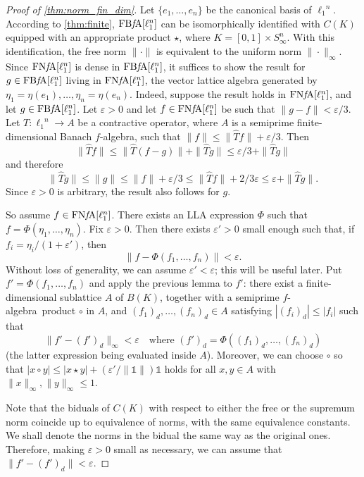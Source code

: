 \documentclass{memo-l}
\theoremstyle{definition}
\theoremstyle{remark}
\numberwithin{section}{chapter}
\numberwithin{equation}{chapter}
\newcommand{\el}[1]{\ensuremath{\ell_{#1}}}
\newcommand{\one}{\ensuremath{\mathbb{1}}}
\newcommand{\falg}{$f\!$-algebra}
\newcommand{\FNFA}[1]{\operatorname{FN{\it f}\!A}[#1]}
\newcommand{\FBFA}[1]{\operatorname{FB{\it f}\!A}[#1]}
\newcommand{\Sinfn}{S_\infty^n}
\begin{document}
\begin{proof}[Proof of \cref{thm:norm_fin_dim}]
    Let $\{e_1,\ldots ,e_n\}$ be the canonical basis of $\el 1^{n}$.
    According to \cref{thm:finite}, $\FBFA{\el 1^{n}}$ can be isomorphically identified with
    $C(K)$ equipped with an appropriate product $\star$, where $K=[0,1]\times
    \Sinfn$.
    With this identification, the free
    norm $\|{\cdot }\|$ is equivalent to the uniform norm $\|{\cdot
    }\|_\infty$. Since $\FNFA {\el 1^{n}}$ is dense in $\FBFA {\el
    1^{n}}$, it suffices to show the result for $g
    \in \FBFA {\el 1^{n}}$ living in $\FNFA {\el 1^{n}}$, the vector lattice algebra generated by
    $\eta _1=\eta (e_1),\ldots ,\eta _n=\eta (e_n)$. Indeed, suppose the
    result holds in $\FNFA {\el 1^{n}}$, and let $g \in \FBFA {\el
    1^{n}}$. Let
    $\varepsilon >0$ and let $f \in \FNFA {\el 1^{n}}$ be such that
    $\|g-f\|<\varepsilon /3$. Let $T\colon \el 1^{n}\to A$ be a contractive
    operator, where $A$ is a semiprime finite-dimensional Banach
    \falg, such that $\|f\|\le
    \|\hat{T}f\|+\varepsilon /3$. Then
    \[
    \|\hat{T}f\|\le \|\hat{T}(f-g)\|+\|\hat{T}g\|\le \varepsilon
    /3+\|\hat{T}g\|
    \]
    and therefore
    \[
    \|\hat{T}g\|\le \|g\|\le \|f\|+\varepsilon /3\le
    \|\hat{T}f\|+2/3\varepsilon \le \varepsilon +\|\hat{T}g\|.
    \]
    Since $\varepsilon >0$ is arbitrary, the result also follows for
    $g$.

    So assume $f \in \FNFA {\el 1^{n}}$. There exists an LLA
    expression $\Phi $ such that $f =\Phi (\eta_1,\ldots ,\eta_n)$.
    Fix $\varepsilon >0$. Then there exists $\varepsilon '>0$ small
    enough such that, if $f_i=\eta _i/(1+\varepsilon ')$, then
    \[
    \|f-\Phi (f_1,\ldots ,f_n)\|<\varepsilon.
    \]
    Without loss of generality, we can assume $\varepsilon
    '<\varepsilon $; this will be useful later.
    Put $f'=\Phi (f_1,\ldots ,f_n)$ and apply the previous lemma to $f'$:
    there exist a finite-dimensional
    sublattice $A$ of $B(K)$, together with a semiprime \falg\ product
    $\circ$ in $A$, and $(f_1)_d,\ldots ,(f_n)_d \in A$ satisfying
    $|(f_i)_d|\le |f_i|$ such that
    \[
    \|f' - (f')_d\|_\infty <\varepsilon \quad\text{where }(f')_d=\Phi ((f_1)_d,\ldots ,(f_n)_d)
    \]
    (the latter expression being evaluated inside $A$). Moreover, we can
    choose $\circ $ so that $|x\circ y|\le |x\star y|+(\varepsilon
    '/\|\one\|)\one$ holds for all $x,y \in A$ with $\|x\|_\infty
    ,\|y\|_\infty \le 1$.

    Note that the biduals of $C(K)$ with respect to either the free or
    the supremum norm coincide up to equivalence of norms, with the same equivalence constants. We shall denote
    the norms in the bidual the same way as the original ones. Therefore, making $\varepsilon
    >0$ small as necessary, we can assume that
    $\|f'-(f')_d\|<\varepsilon $.


\end{proof}
\end{document}
